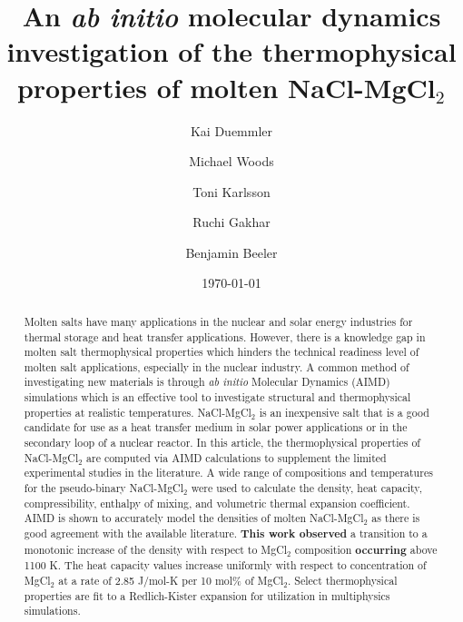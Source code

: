 \documentclass[review]{elsarticle}
\providecommand{\DIFaddtex}[1]{{\bf #1}} %
\providecommand{\DIFdeltex}[1]{} %
\providecommand{\DIFaddbegin}{\protect\color{blue}} %
\providecommand{\DIFaddend}{\protect\color{black}} %
\providecommand{\DIFdelbegin}{\protect\color{red}} %
\providecommand{\DIFdelend}{\protect\color{black}} %
\providecommand{\DIFadd}[1]{\texorpdfstring{\DIFaddtex{#1}}{#1}} %
\providecommand{\DIFdel}[1]{\texorpdfstring{\DIFdeltex{#1}}{}} %
\newcommand{\DIFscaledelfig}{0.5}
\newlength{\DIFdelgraphicswidth} %
\newlength{\DIFdelgraphicsheight} %
\newcommand{\DIFaddincludegraphics}[2][]{{\color{blue}\fbox{\DIFOincludegraphics[#1]{#2}}}} %
\newcommand{\DIFdelincludegraphics}[2][]{%
\sbox{\DIFdelgraphicsbox}{\DIFOincludegraphics[#1]{#2}}%
\settoboxwidth{\DIFdelgraphicswidth}{\DIFdelgraphicsbox} %
\settoboxtotalheight{\DIFdelgraphicsheight}{\DIFdelgraphicsbox} %
\scalebox{\DIFscaledelfig}{%
\parbox[b]{\DIFdelgraphicswidth}{\usebox{\DIFdelgraphicsbox}\\[-\baselineskip] \rule{\DIFdelgraphicswidth}{0em}}\llap{\resizebox{\DIFdelgraphicswidth}{\DIFdelgraphicsheight}{%
\setlength{\unitlength}{\DIFdelgraphicswidth}%
\begin{picture}(1,1)%
\thicklines\linethickness{2pt} %
{\color[rgb]{1,0,0}\put(0,0){\framebox(1,1){}}}%
{\color[rgb]{1,0,0}\put(0,0){\line( 1,1){1}}}%
{\color[rgb]{1,0,0}\put(0,1){\line(1,-1){1}}}%
\end{picture}%
}\hspace*{3pt}}} %
} %
\DeclareRobustCommand{\DIFaddbegin}{\DIFOaddbegin \let\includegraphics\DIFaddincludegraphics} %
\DeclareRobustCommand{\DIFaddend}{\DIFOaddend \let\includegraphics\DIFOincludegraphics} %
\DeclareRobustCommand{\DIFdelbegin}{\DIFOdelbegin \let\includegraphics\DIFdelincludegraphics} %
\DeclareRobustCommand{\DIFdelend}{\DIFOaddend \let\includegraphics\DIFOincludegraphics} %
\begin{document}
\begin{frontmatter}

\title{An \textit{ab initio} molecular dynamics investigation of the thermophysical properties of molten NaCl-MgCl$_2$ }

\author[ncsu]{Kai Duemmler}
\author[inl]{Michael Woods}
\author[inl]{Toni Karlsson}
\author[inl]{Ruchi Gakhar}
\author[ncsu,inl]{Benjamin Beeler}

\address[ncsu]{North Carolina State University, Raleigh, NC 27695}
\address[inl]{Idaho National Laboratory, Idaho Falls, ID 83415}
\date{\today}

\begin{abstract}
Molten salts have many applications in the nuclear and solar energy industries for thermal storage and heat transfer applications. However, there is a knowledge gap in molten salt thermophysical properties which hinders the technical readiness level of molten salt applications, especially in the nuclear industry. A common method of investigating new materials is through \textit{ab initio} Molecular Dynamics (AIMD) simulations which is an effective tool to investigate structural and thermophysical properties at realistic temperatures. NaCl-MgCl$_2$ is an inexpensive salt that is a good candidate for use as a heat transfer medium in solar power applications or in the secondary loop of a nuclear reactor. In this article, the thermophysical properties of NaCl-MgCl$_2$ are computed via AIMD calculations to supplement the limited experimental studies in the literature. A wide range of compositions and temperatures for the pseudo-binary NaCl-MgCl$_2$ were used to calculate the density, heat capacity, compressibility, enthalpy of mixing, and volumetric thermal expansion coefficient. AIMD is shown to accurately model the densities of molten NaCl-MgCl$_2$ as there is good agreement with the available literature. \DIFdelbegin \DIFdel{Observed }\DIFdelend \DIFaddbegin \DIFadd{This work observed }\DIFaddend a transition to a monotonic increase of the density with respect to MgCl$_2$ composition \DIFdelbegin \DIFdel{occurs }\DIFdelend \DIFaddbegin \DIFadd{occurring }\DIFaddend above 1100 K. The heat capacity values increase uniformly with respect to concentration of MgCl$_2$ at a rate of 2.85 J/mol-K per 10 mol\% of MgCl$_2$. Select thermophysical properties are fit to a Redlich-Kister expansion for utilization in multiphysics simulations. 
\end{abstract}

\end{frontmatter}
\end{document}
